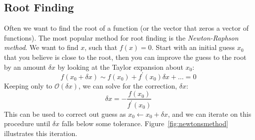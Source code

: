 \subsection{Root Finding}

Often we want to find the root of a function (or the vector that zeros
a vector of functions).  The most popular method for root finding is
the {\em Newton-Raphson method}.  We want to find $x$, such that $f(x)
= 0$.  Start with an initial guess $x_0$ that you believe is close to
the root, then you can improve the guess to the root by an amount
$\delta x$ by looking at the Taylor expansion about $x_0$:
\begin{equation}
f(x_0 + \delta x) \sim f(x_0) + f^\prime(x_0) \delta x + \ldots = 0
\end{equation}
Keeping only to $\mathcal{O}(\delta x)$, we can solve for the correction, $\delta x$:
\begin{equation}
\label{eq:intro:newtonsmethod}
  \delta x = -\frac{f(x_0)}{f^\prime(x_0)}
\end{equation}
This can be used to correct out guess as $x_0 \leftarrow x_0 + \delta
x$, and we can iterate on this procedure until $\delta x$ falls below
some tolerance.  Figure~\ref{fig:newtonsmethod} illustrates this
iteration.

